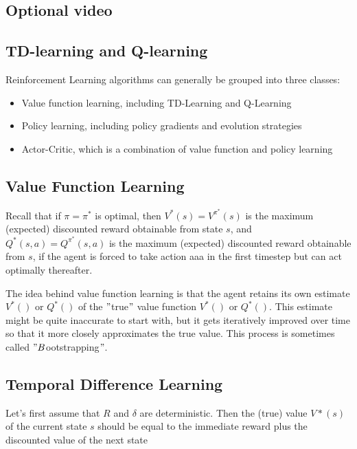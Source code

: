 \documentclass[11pt]{article}
\begin{document}
\subsection{Optional video}\label{subsec:optional-video5}

\subsection{TD-learning and Q-learning}\label{subsec:td-learning-and-q-learning}
Reinforcement Learning algorithms can generally be grouped into three classes:

\begin{itemize}
  \item Value function learning, including TD-Learning and Q-Learning
  \item Policy learning, including policy gradients and evolution strategies
  \item Actor-Critic, which is a combination of value function and policy learning
\end{itemize}

\subsection{Value Function Learning}\label{subsec:value-function-learning}
Recall that if $\pi = \pi^*$ is optimal, then $V^*(s) = V^{\pi^*} (s)$ is the
maximum (expected) discounted reward obtainable from state $s$, and
$Q^*(s,a) = Q^{\pi^*}(s,a)$ is the maximum (expected) discounted reward
obtainable from $s$, if the agent is forced to take action aaa in the first
timestep but can act optimally thereafter.

The idea behind value function learning is that the agent retains its own
estimate $V^*()$ or $Q^*()$ of the \("\)true\("\) value function $V^*()$ or $Q^*()$.
This estimate might be quite inaccurate to start with, but it gets iteratively
improved over time so that it more closely approximates the true value.
This process is sometimes called \("B\)ootstrapping\("\).

\subsection{Temporal Difference Learning}\label{subsec:temporal-difference-learning}
Let’s first assume that $R$ and $\delta$ are deterministic.
Then the (true) value $V*(s)$ of the current state $s$ should be equal to the
immediate reward plus the discounted value of the next state
\end{document}
